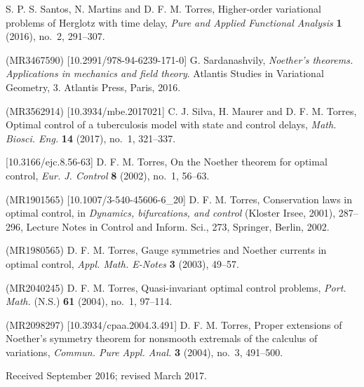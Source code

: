 \documentclass{my-aims}
\theoremstyle{definition}
\begin{document}
\begin{thebibliography}{99}
\newblock S. P. S. Santos, N. Martins and D. F. M. Torres,
\newblock Higher-order variational problems of Herglotz with time delay,
\newblock \emph{Pure and Applied Functional Analysis} \textbf{1} (2016), no.~2, 291--307.
\newblock {}

 (MR3467590) [10.2991/978-94-6239-171-0]
\newblock G. Sardanashvily, 
\newblock \emph{Noether's theorems. Applications in mechanics and field theory}. 
\newblock Atlantis Studies in Variational Geometry, 3. 
\newblock Atlantis Press, Paris, 2016. 

 (MR3562914) [10.3934/mbe.2017021]
\newblock C. J. Silva, H. Maurer and D. F. M. Torres,
\newblock Optimal control of a tuberculosis model with state and control delays,
\newblock \emph{Math. Biosci. Eng.} {\bf 14} (2017), no.~1, 321--337.
\newblock {}

 [10.3166/ejc.8.56-63]
\newblock D. F. M. Torres,
\newblock On the Noether theorem for optimal control,
\newblock \emph{Eur. J. Control} {\bf 8} (2002), no.~1, 56--63.

 (MR1901565) [10.1007/3-540-45606-6_20]
\newblock D. F. M. Torres,
\newblock Conservation laws in optimal control,
\newblock in \emph{Dynamics, bifurcations, and control} (Kloster Irsee, 2001), 287--296,
Lecture Notes in Control and Inform. Sci., 273, Springer, Berlin, 2002.

 (MR1980565)
\newblock D. F. M. Torres, 
\newblock Gauge symmetries and Noether currents in optimal control, 
\newblock \emph{Appl. Math. E-Notes} {\bf 3} (2003), 49--57. 
\newblock {}

 (MR2040245)
\newblock D. F. M. Torres, 
\newblock Quasi-invariant optimal control problems, 
\newblock \emph{Port. Math.} (N.S.) {\bf 61} (2004), no.~1, 97--114. 
\newblock {}

 (MR2098297) [10.3934/cpaa.2004.3.491]
\newblock D. F. M. Torres, 
\newblock Proper extensions of Noether's symmetry theorem 
for nonsmooth extremals of the calculus of variations,
\newblock \emph{Commun. Pure Appl. Anal.} {\bf 3} (2004), no.~3, 491--500.

\end{thebibliography}


\medskip
Received September 2016; revised March 2017.
\medskip

\end{document}
